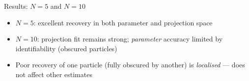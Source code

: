 \documentclass{beamer}
\begin{document}
\begin{frame}{Results: $N = 5$ and $N = 10$}
        \vspace{0.5em}
        \begin{itemize}
            \item $N = 5$: excellent recovery in both parameter and projection space
            \item $N = 10$: projection fit remains strong; \emph{parameter} accuracy limited by identifiability (obscured particles)
            \item Poor recovery of one particle (fully obscured by another) is \emph{localised} --- does not affect other estimates
        \end{itemize}

    \end{frame}
\end{document}
